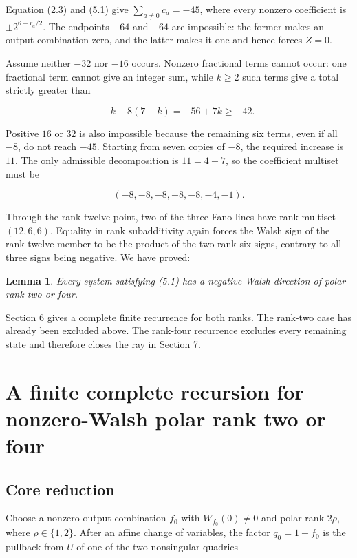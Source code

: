 \documentclass[11pt]{article}
\newtheorem{lemma}[theorem]{Lemma}
\theoremstyle{remark}
\numberwithin{equation}{section}
\begin{document}
Equation (2.3) and (5.1) give \(\sum_{a\ne0}c_a=-45\), where every nonzero
coefficient is \(\pm2^{6-r_a/2}\). The endpoints \(+64\) and \(-64\) are
impossible: the former makes an output combination zero, and the latter makes
it one and hence forces \(Z=0\).

Assume neither \(-32\) nor \(-16\) occurs. Nonzero fractional terms cannot
occur: one fractional term cannot give an integer sum, while \(k\ge2\) such
terms give a total strictly greater than

\[
-k-8(7-k)=-56+7k\ge-42.
\]

Positive \(16\) or \(32\) is also impossible because the remaining six terms,
even if all \(-8\), do not reach \(-45\). Starting from seven copies of \(-8\),
the required increase is \(11\). The only admissible decomposition is
\(11=4+7\), so the coefficient multiset must be

\[
(-8,-8,-8,-8,-8,-4,-1).                        \tag{5.5}
\]

Through the rank-twelve point, two of the three Fano lines have rank multiset
\((12,6,6)\). Equality in rank subadditivity again forces the Walsh sign of the
rank-twelve member to be the product of the two rank-six signs, contrary to all
three signs being negative. We have proved:

\Needspace{0.23\textheight}
\begin{lemma}
Every system satisfying (5.1) has a negative-Walsh direction of
polar rank two or four.
\end{lemma}


Section 6 gives a complete finite recurrence for both ranks. The rank-two case
has already been excluded above. The rank-four recurrence excludes every
remaining state and therefore closes the ray in Section 7.

\section{A finite complete recursion for nonzero-Walsh polar rank two or four}


\subsection{Core reduction}


Choose a nonzero output combination \(f_0\) with \(W_{f_0}(0)\ne0\) and polar
rank \(2\rho\), where \(\rho\in\{1,2\}\). After an affine change of variables,
the factor \(q_0=1+f_0\) is the pullback from \(U\) of one of the two
nonsingular quadrics
\end{document}
